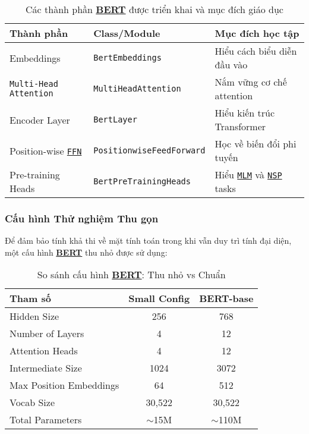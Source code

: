 \begin{table}[H]
\centering
\caption{Các thành phần \hyperref[acro:bert]{\textbf{BERT}} được triển khai và mục đích giáo dục}
\label{tab:bert_components}
\begin{tabular}{lll}
\toprule
\textbf{Thành phần} & \textbf{Class/Module} & \textbf{Mục đích học tập} \\
\midrule
Embeddings & \texttt{BertEmbeddings} & Hiểu cách biểu diễn đầu vào \\
\texttt{Multi-Head Attention} & \texttt{MultiHeadAttention} & Nắm vững cơ chế attention \\
Encoder Layer & \texttt{BertLayer} & Hiểu kiến trúc Transformer
\\
Position-wise \hyperref[acro:ffn]{\texttt{FFN}} & \texttt{PositionwiseFeedForward} & Học về biến đổi phi tuyến \\
Pre-training Heads & \texttt{BertPreTrainingHeads} & Hiểu \hyperref[acro:mlm]{\texttt{MLM}} và \hyperref[acro:nsp]{\texttt{NSP}} tasks \\
\bottomrule
\end{tabular}
\end{table}

\subsubsection{Cấu hình Thử nghiệm Thu gọn}
Để đảm bảo tính khả thi về mặt tính toán trong khi vẫn duy trì tính đại diện, một cấu hình \hyperref[acro:bert]{\textbf{BERT}} thu nhỏ được sử dụng:

\begin{table}[H]
\centering
\caption{So sánh cấu hình \hyperref[acro:bert]{\textbf{BERT}}: Thu nhỏ vs Chuẩn}
\label{tab:bert_config_comparison}
\begin{tabular}{lcc}
\toprule
\textbf{Tham số} & \textbf{Small Config} & \textbf{BERT-base} \\
\midrule
Hidden Size & 256 & 768 \\
Number of Layers & 4 & 12 \\
Attention Heads & 4 & 12 \\
Intermediate Size & 1024 & 3072 \\
Max Position Embeddings & 64 & 512 \\
Vocab
Size & 30,522 & 30,522 \\
Total Parameters & $\sim$15M & $\sim$110M \\
\bottomrule
\end{tabular}
\end{table}

